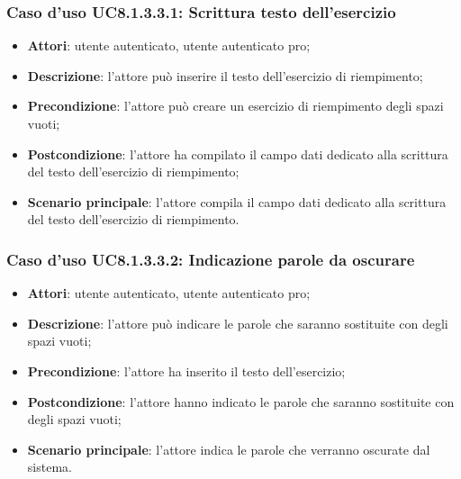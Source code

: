 \subsubsection{Caso d'uso UC8.1.3.3.1: Scrittura testo dell'esercizio}
	\begin{itemize}
		\item
			\textbf{Attori}: utente autenticato, utente autenticato pro;
		\item		
			\textbf{Descrizione}: l'attore può inserire il testo dell'esercizio di riempimento;
		\item
			\textbf{Precondizione}: l'attore può creare un esercizio di riempimento degli spazi vuoti; 
		\item
			\textbf{Postcondizione}: l'attore ha compilato il campo dati dedicato alla scrittura del testo dell'esercizio di riempimento;
		\item
			\textbf{Scenario principale}: l'attore compila il campo dati dedicato alla scrittura del testo dell'esercizio di riempimento.
	\end{itemize}


\subsubsection{Caso d'uso UC8.1.3.3.2: Indicazione parole da oscurare}
	\begin{itemize}
		\item
			\textbf{Attori}: utente autenticato, utente autenticato pro;
		\item		
			\textbf{Descrizione}: l'attore può indicare le parole che saranno sostituite con degli spazi vuoti;
		\item
			\textbf{Precondizione}: l'attore ha inserito il testo dell'esercizio; 
		\item
			\textbf{Postcondizione}: l'attore hanno indicato le parole che saranno sostituite con degli spazi vuoti;
		\item
			\textbf{Scenario principale}: l'attore indica le parole che verranno oscurate dal sistema.
	\end{itemize}